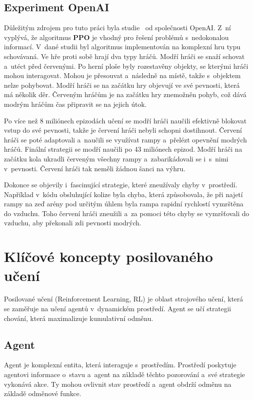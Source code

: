 \subsection{Experiment OpenAI}\label{subsec:experiment-openai}
Důležitým zdrojem pro tuto práci byla studie~\cite{PPO_Hide_Seek_paper} od společnosti OpenAI.
Z~ní vyplývá, že algoritmus \textbf{PPO} je vhodný pro řešení problémů s~nedokonalou informací.
V~dané studii byl algoritmus implementován na komplexní hru typu schovávaná.
Ve hře proti sobě hrají dva typy hráčů.
Modří hráči se snaží schovat a~utéct před červenými.
Po herní ploše byly rozestavěny objekty, se kterými hráči mohou interagovat.
Mohou je přesouvat a~následně  na místě, takže s~objektem nelze pohybovat.
Modří hráči se na začátku hry objevují ve své pevnosti, která má několik děr.
Červeným hráčům je na začátku hry znemožněn pohyb, což dává modrým hráčům čas připravit se na jejich útok.

Po více než 8 miliónech epizodách učení se modří hráči naučili efektivně blokovat vstup do své pevnosti, takže je červení hráči nebyli schopni dostihnout.
Červení hráči se poté adaptovali a~naučili se využívat rampy a~přelézt opevnění modrých hráčů.
Finální strategii se modří naučili po 43 miliónech epizod.
Modří hráči na začátku kola ukradli červeným všechny rampy a~zabarikádovali se i~s~nimi v~pevnosti.
Červení hráči tak neměli žádnou šanci na výhru.

Dokonce se objevily i~fascinující strategie, které zneužívaly chyby v~prostředí.
Například v~kódu obsluhující kolize byla chyba, která způsobovala, že při najetí rampy na zeď arény pod určitým úhlem byla rampa rapidní rychlostí vymrštěna do vzduchu.
Toho červení hráči zneužili a~za pomoci této chyby se vymršťovali do vzduchu, aby překonali zdi pevnosti modrých.

\section{Klíčové koncepty posilovaného učení}\label{sec:klicove-koncepty-posilovaneho-uceni}
Posilované učení (Reinforcement Learning, RL) je oblast strojového učení, která se zaměřuje na učení agentů v~dynamickém prostředí.
Agent se učí strategii chování, která maximalizuje kumulativní odměnu.

\subsection{Agent}\label{subsec:agent}
Agent je komplexní entita, která interaguje s~prostředím.
Prostředí poskytuje agentovi informace o~stavu a~agent na základě těchto pozorování a~své strategie vykonává akce.
Ty mohou ovlivnit stav prostředí a~agent obdrží odměnu na základě odměnové funkce.

